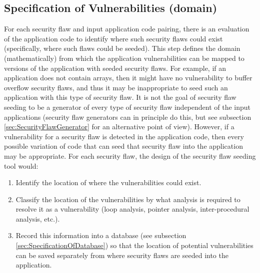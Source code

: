 \subsection{Specification of Vulnerabilities (domain)}
         \label{sec:SpecificationOfVulnerabilities}
         For each security flaw and input application code pairing, there is an evaluation
         of the application code to identify where such security flaws could exist
         (specifically, where such flaws could be seeded).  This step defines the
         domain (mathematically) from which the application vulnerabilities can be mapped
         to versions of the application with seeded security flaws. For example, if
         an application does not contain arrays, then it might have no vulnerability
         to buffer overflow security flaws, and thus it may be inappropriate to seed 
         such an application with this type of security flaw.  It is not the goal
         of security flaw seeding to be a generator of every type of security flaw
         independent of the input applications (security flaw generators can in principle
         do this, but see subsection \ref{sec:SecurityFlawGenerator} for an alternative 
         point of view).  However, if a vulnerability for a security flaw is detected in
         the application code, then every possible variation of code that can seed that
         security flaw into the application may be appropriate. For each security flaw,
         the design of the security flaw seeding tool would:
            \begin{enumerate}
               \item Identify the location of where the vulnerabilities could exist.
               \item Classify the location of the vulnerabilities by what analysis is
                     required to resolve it as a vulnerability (loop analysis, pointer
                     analysis, inter-procedural analysis, etc.).
               \item Record this information into a database (see 
                     subsection \ref{sec:SpecificationOfDatabase}) so that the location of
                     potential vulnerabilities can be saved separately from where
                     security flaws are seeded into the application.
            \end{enumerate}

